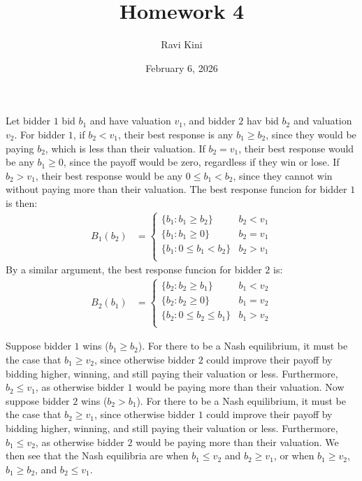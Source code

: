 \documentclass{article}
\title{Homework 4}
\author{Ravi Kini}
\date{February 6, 2026}
\begin{document}
\maketitle

\problem{}
Let bidder $1$ bid $b_1$ and have valuation $v_1$, and bidder $2$ hav bid $b_2$ and valuation $v_2$. For bidder $1$, if $b_2 < v_1$, their best response is any $b_1 \geq b_2$, since they would be paying $b_2$, which is less than their valuation. If $b_2 = v_1$, their best response would be any $b_1 \geq 0$, since the payoff would be zero, regardless if they win or lose. If $b_2 > v_1$, their best response would be any $0 \leq b_1 < b_2$, since they cannot win without paying more than their valuation. The best response funcion for bidder $1$ is then:
\begin{align*}
    B_1(b_2) & = \begin{cases}
        \{b_1 : b_1 \geq b_2\} & b_2 < v_1 \\
        \{b_1 : b_1 \geq 0\} & b_2 = v_1 \\
        \{b_1 : 0 \leq b_1 < b_2\} & b_2 > v_1 \\
    \end{cases}
\end{align*}
By a similar argument, the best response funcion for bidder $2$ is:
\begin{align*}
    B_2(b_1) & = \begin{cases}
        \{b_2 : b_2 \geq b_1\} & b_1 < v_2 \\
        \{b_2 : b_2 \geq 0\} & b_1 = v_2 \\
        \{b_2 : 0 \leq b_2 \leq b_1\} & b_1 > v_2 \\
    \end{cases}
\end{align*}

Suppose bidder $1$ wins ($b_1 \geq b_2$). For there to be a Nash equilibrium, it must be the case that $b_1 \geq v_2$, since otherwise bidder $2$ could improve their payoff by bidding higher, winning, and still paying their valuation or less. Furthermore, $b_2 \leq v_1$, as otherwise bidder $1$ would be paying more than their valuation. Now suppose bidder $2$ wins ($b_2 > b_1$). For there to be a Nash equilibrium, it must be the case that $b_2 \geq v_1$, since otherwise bidder $1$ could improve their payoff by bidding higher, winning, and still paying their valuation or less. Furthermore, $b_1 \leq v_2$, as otherwise bidder $2$ would be paying more than their valuation. We then see that the Nash equilibria are when $b_1 \leq v_2$ and $b_2 \geq v_1$, or when $b_1 \geq v_2$, $b_1 \geq b_2$, and $b_2 \leq v_1$. 
\end{document}
